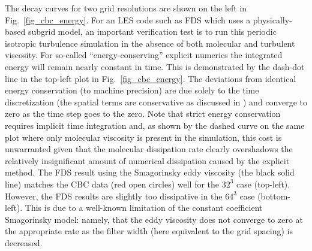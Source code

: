 \documentclass[11pt]{book}
\begin{document}
The decay curves for two grid resolutions are shown on the left in Fig.~\ref{fig_cbc_energy}.  For an LES code such as FDS which uses a physically-based subgrid model, an important verification test is to run this periodic isotropic turbulence simulation in the absence of both molecular and turbulent viscosity.  For so-called ``energy-conserving'' explicit numerics the integrated energy will remain nearly constant in time.  This is demonstrated by the dash-dot line in the top-left plot in Fig.~\ref{fig_cbc_energy}.  The deviations from identical energy conservation (to machine precision) are due solely to the time discretization (the spatial terms are conservative as discussed in \cite{Morinishi}) and converge to zero as the time step goes to the zero.  Note that strict energy conservation requires implicit time integration \cite{Ham,McDermott:2007b} and, as shown by the dashed curve on the same plot where only molecular viscosity is present in the simulation, this cost is unwarranted given that the molecular dissipation rate clearly overshadows the relatively insignificant amount of numerical dissipation caused by the explicit method.  The FDS result using the Smagorinsky eddy viscosity (the black solid line) matches the CBC data (red open circles) well for the $32^3$ case (top-left).  However, the FDS results are slightly too dissipative in the $64^3$ case (bottom-left).  This is due to a well-known limitation of the constant coefficient Smagorinsky model: namely, that the eddy viscosity does not converge to zero at the appropriate rate as the filter width (here equivalent to the grid spacing) is decreased.
\end{document}
